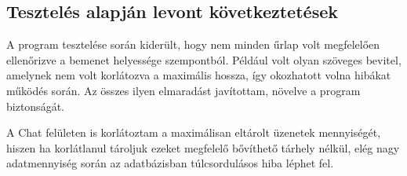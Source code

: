 \subsection{Tesztelés alapján levont következtetések}

A program tesztelése során kiderült, hogy nem minden űrlap volt megfelelően ellenőrizve a bemenet helyessége szempontból. Például volt olyan szöveges bevitel, amelynek nem volt korlátozva a maximális hossza, így okozhatott volna hibákat működés során. Az összes ilyen elmaradást javítottam, növelve a program biztonságát.

\bigskip

A Chat felületen is korlátoztam a maximálisan eltárolt üzenetek mennyiségét, hiszen ha korlátlanul tároljuk ezeket megfelelő bővíthető tárhely nélkül, elég nagy adatmennyiség során az adatbázisban túlcsordulásos hiba léphet fel. 
